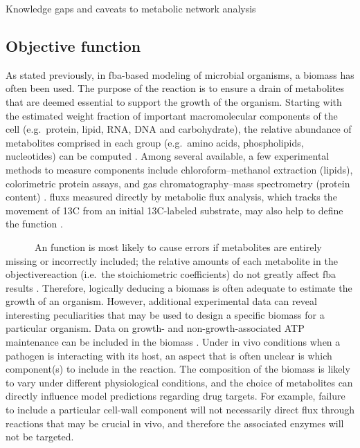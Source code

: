\begin{pabox}[label=trends:box:caveats,float*=bt,width=\textwidth]{Knowledge gaps and caveats to metabolic network analysis}
\begin{multicols}{2}
\subsection*{Objective function}
As stated previously, in \gls{fba}-based modeling of microbial organisms, 
a \gls{biomass} has often been used. The purpose of 
the reaction is to ensure a drain of metabolites that 
are deemed essential to support the growth of the 
organism. Starting with the estimated weight fraction 
of important macromolecular components of the cell 
(e.g.\ protein, lipid, RNA, DNA and carbohydrate), the 
relative abundance of metabolites comprised in each 
group (e.g.\ amino acids, phospholipids, nucleotides) 
can be computed \cite{Feist:2010hq}. Among several available, a few 
experimental methods to measure  components 
include chloroform–methanol extraction (lipids), 
colorimetric protein assays, and gas chromatography–mass 
spectrometry (protein content) \cite{Boyle:2009jr}. \Glspl{flux} measured 
directly by metabolic flux analysis, which tracks 
the movement of 13C from an initial 13C-labeled 
substrate, may also help to define the  
function \cite{Chen:2011dj,Blank:2005bt}.

~~~~~~An  function is most likely to cause 
errors if metabolites are entirely missing or 
incorrectly included; the relative amounts of each 
metabolite in the \gls{objectivereaction} (i.e.\ the 
stoichiometric coefficients) do not greatly affect 
\gls{fba} results \cite{Varma:1993hd,Varma:1994tb}. Therefore, logically 
deducing a \gls{biomass} is often adequate 
to estimate the growth of an organism. However, 
additional experimental data can reveal interesting 
peculiarities that may be used to design a specific 
\gls{biomass} for a particular organism. 
Data on growth- and non-growth-associated ATP 
maintenance can be included in the \gls{biomass} \cite{Forster:2003jb}. Under in vivo conditions when a 
pathogen is interacting with its host, an aspect 
that is often unclear is which  component(s) 
to include in the reaction. The composition of the 
\gls{biomass} is likely to vary under different 
physiological conditions, and the choice of metabolites 
can directly influence model predictions regarding 
drug targets. For example, failure to include a 
particular cell-wall component will not necessarily 
direct \gls{flux} through reactions that may be crucial in 
vivo, and therefore the associated enzymes will not 
be targeted.
\end{multicols}
\end{pabox}
